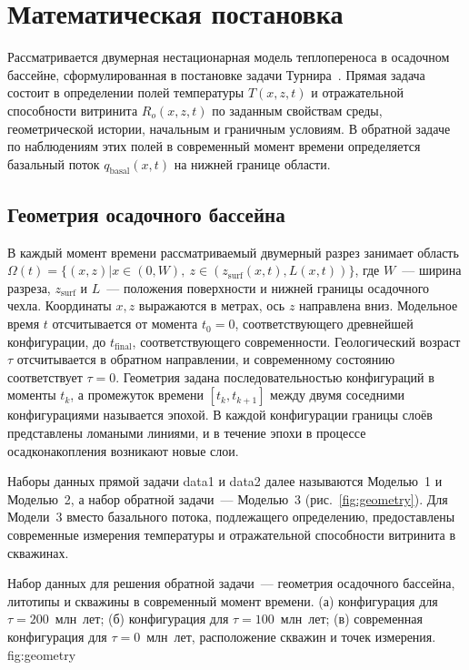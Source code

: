 \section{Математическая постановка}
\label{sec:problem}

Рассматривается двумерная нестационарная модель теплопереноса в осадочном бассейне, сформулированная в постановке задачи Турнира~\cite{problem2026}. Прямая задача состоит в определении полей температуры $T(x,z,t)$ и отражательной способности витринита $R_o(x,z,t)$ по заданным свойствам среды, геометрической истории, начальным и граничным условиям. В обратной задаче по наблюдениям этих полей в современный момент времени определяется базальный поток $q_{\mathrm{basal}}(x,t)$ на нижней границе области.

\subsection{Геометрия осадочного бассейна}

В каждый момент времени рассматриваемый двумерный разрез занимает область $\Omega(t)=\{(x,z)|x \in (0, W),\ z \in (z_{\mathrm{surf}}(x,t), L(x,t))\}$, где $W$~--- ширина разреза, $z_{\mathrm{surf}}$ и $L$~--- положения поверхности и нижней границы осадочного чехла. Координаты $x,z$ выражаются в метрах, ось $z$ направлена вниз. Модельное время $t$ отсчитывается от момента $t_0=0$, соответствующего древнейшей конфигурации, до $t_{\mathrm{final}}$, соответствующего современности. Геологический возраст $\tau$ отсчитывается в обратном направлении, и современному состоянию соответствует $\tau=0$. Геометрия задана последовательностью конфигураций в моменты $t_k$, а промежуток времени $[t_k,t_{k+1}]$ между двумя соседними конфигурациями называется эпохой. В каждой конфигурации границы слоёв представлены ломаными линиями, и в течение эпохи в процессе осадконакопления возникают новые слои.

Наборы данных прямой задачи data1 и data2 далее называются Моделью~1 и Моделью~2, а набор обратной задачи~--- Моделью~3 (рис.~\ref{fig:geometry}). Для Модели~3 вместо базального потока, подлежащего определению, предоставлены современные измерения температуры и отражательной способности витринита в скважинах.

 {Набор данных для решения обратной задачи~--- геометрия осадочного бассейна, литотипы и скважины в современный момент времени. (а) конфигурация для $\tau=200$~млн~лет; (б) конфигурация для $\tau=100$~млн~лет; (в) современная конфигурация для $\tau=0$~млн~лет, расположение скважин и точек измерения.} {fig:geometry}

